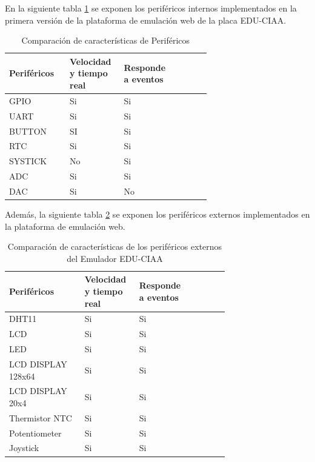 En la siguiente tabla \ref{tab:perifericosInternosCIAA} se exponen los  periféricos internos implementados en la primera versión de la plataforma de emulación web de la placa EDU-CIAA.

\begin{table}[h]
\centering
\caption[Comparación de características de periféricos internos del Emulador EDU-CIAA]{Comparación de características de Periféricos}
\begin{tabular}{p{0.24\linewidth} p{0.14\linewidth}  p{0.14\linewidth}  p{0.14\linewidth}}
\toprule
\textbf{Periféricos} 
& \textbf{Velocidad y tiempo real}
& \textbf{Responde a eventos}
\\
\midrule
GPIO & Si & Si  \\
UART & Si & Si \\
BUTTON & SI & Si \\
RTC & Si & Si  \\
SYSTICK & No & Si \\
ADC & Si & Si \\
DAC & Si & No \\
\bottomrule
\hline
\end{tabular}
\label{tab:perifericosInternosCIAA}
\end{table}


Además, la siguiente tabla \ref{tab:perifericosExternosCIAA} se exponen los  periféricos externos implementados en la plataforma de emulación web.


\begin{table}[h]
\centering
\caption[Comparación de características de periféricos externos del Emulador EDU-CIAA]{Comparación de características de los periféricos externos del Emulador EDU-CIAA}
\begin{tabular}{p{0.30\linewidth} p{0.14\linewidth}  p{0.14\linewidth}  p{0.14\linewidth}}
\toprule
\textbf{Periféricos} 
& \textbf{Velocidad y tiempo real}
& \textbf{Responde a eventos}
\\
\midrule
DHT11 & Si & Si  \\
LCD & Si & Si  \\
LED & Si & Si  \\
LCD DISPLAY 128x64 & Si & Si \\
LCD DISPLAY 20x4 & Si & Si \\
Thermistor NTC & Si & Si \\
Potentiometer & Si & Si \\
Joystick & Si & Si \\
\bottomrule
\hline
\end{tabular}
\label{tab:perifericosExternosCIAA}
\end{table}


